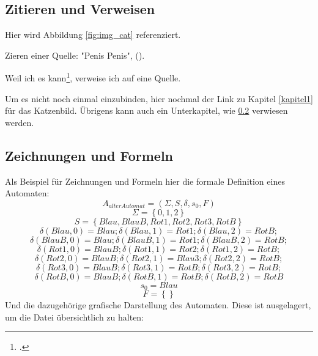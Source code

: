 \documentclass[../main.tex]{subfiles}
\begin{document}
\subsection{Zitieren und Verweisen}
\label{zitieren_und_verweisen}
Hier wird Abbildung \ref{fig:img_cat} referenziert.

Zieren einer Quelle: "Penis Penis", (\cite[Seite 11]{theoretischeinformatik}).

Weil ich es kann\footcite[][]{spektumperformance}, verweise ich auf eine Quelle. %

Um es nicht noch einmal einzubinden, hier nochmal der Link zu Kapitel \ref{kapitel1} für das Katzenbild. Übrigens kann auch ein Unterkapitel, wie \ref{zeichnungen_und_formeln} verwiesen werden.

\subsection{Zeichnungen und Formeln}
\label{zeichnungen_und_formeln}
Als Beispiel für Zeichnungen und Formeln hier die formale Definition eines Automaten:
$$A_{alterAutomat} = (\Sigma, S, \delta, s_{0}, F)$$
$$\Sigma = \left\{0, 1, 2\right\}$$
$$S = \left\{Blau, BlauB, Rot1, Rot2, Rot3, RotB\right\}$$
$$\delta(Blau, 0) = Blau; \delta(Blau, 1) = Rot1; \delta(Blau, 2) = RotB;$$
$$\delta(BlauB, 0) = Blau; \delta(BlauB, 1) = Rot1; \delta(BlauB, 2) = RotB;$$
$$\delta(Rot1, 0) = BlauB; \delta(Rot1, 1) = Rot2; \delta(Rot1, 2) = RotB;$$
$$\delta(Rot2, 0) = BlauB; \delta(Rot2, 1) = Blau3; \delta(Rot2, 2) = RotB;$$
$$\delta(Rot3, 0) = BlauB; \delta(Rot3, 1) = RotB; \delta(Rot3, 2) = RotB;$$
$$\delta(RotB, 0) = BlauB; \delta(RotB, 1) = RotB; \delta(RotB, 2) = RotB$$
$$s_{0} = Blau$$
$$F = \left\{\right\}$$
Und die dazugehörige grafische Darstellung des Automaten. Diese ist ausgelagert, um die Datei übersichtlich zu halten:


\end{document}
